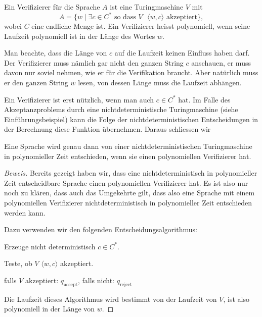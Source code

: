\begin{definition}
%
Ein Verifizierer für die Sprache $A$ ist eine Turingmaschine
$V$ mit
\[
A=\{
w\;|\;\text{$\exists c\in C^*$ so dass $V$ $\langle w,c\rangle$ akzeptiert}
\},
\]
wobei $C$ eine endliche Menge ist.
Ein Verifizierer heisst polynomiell, wenn seine Laufzeit polynomiell
ist in der Länge des Wortes $w$.
\end{definition}

Man beachte, dass die Länge von $c$ auf die Laufzeit keinen
Einfluss haben darf. Der Verifizierer muss nämlich gar nicht
den ganzen String $c$ anschauen, er muss davon nur soviel
nehmen, wie er für die Verifikation braucht. Aber natürlich
muss er den ganzen String $w$ lesen, von dessen Länge muss
die Laufzeit abhängen.

Ein Verifizierer ist erst nützlich, wenn man auch $c\in C^*$
hat. Im Falle des Akzeptanzproblems durch eine nichtdeterministische
Turingmaschine (siehe Einführungsbeispiel) kann die Folge der
nichtdeterministischen Entscheidungen in der Berechnung diese
Funktion übernehmen. Daraus schliessen wir

\begin{satz} Eine Sprache wird genau dann von einer
nichtdeterministischen Turingmaschine in polynomieller Zeit entschieden,
wenn sie einen polynomiellen Verifizierer hat.
\end{satz}

\begin{proof}[Beweis]
Bereits gezeigt haben wir, dass eine nichtdeterministisch in
polynomieller Zeit entscheidbare Sprache einen polynomiellen Verifizierer hat.
Es ist also
nur noch zu klären, dass auch das Umgekehrte gilt, dass also eine
Sprache mit einem polynomiellen Verifizierer nichtdeterministisch
in polynomieller Zeit entschieden werden kann.

Dazu verwenden wir den folgenden Entscheidungsalgorithmus:
\begin{compactenum}
\item Erzeuge nicht deterministisch $c\in C^*$.
\item Teste, ob $V$ $\langle w,c\rangle$ akzeptiert.
\item falls $V$ akzeptiert: $q_{\text{accept}}$, falls nicht:
$q_{\text{reject}}$
\end{compactenum}
Die Laufzeit dieses Algorithmus wird bestimmt von der Laufzeit von $V$,
ist also polynomiell in der Länge von $w$.
\end{proof}

